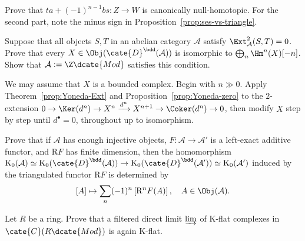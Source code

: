 \begin{Exercises}
	\begin{hint}
		Prove that $ta+(-1)^{n-1}bs:Z\to W$ is canonically null-homotopic. For
		the second part, note the minus sign in
		Proposition~\ref{prop:ses-vs-triangle}.
	\end{hint}

	\item Suppose that all objects $S,T$ in an abelian category $\mathcal{A}$
	satisfy $\Ext^2_{\mathcal{A}}(S,T)=0$. Prove that every
	$X\in\Obj(\cate{D}^{\bdd}(\mathcal{A}))$ is isomorphic to
	$\bigoplus_n\Hm^n(X)[-n]$. Show that $\mathcal{A}:=\Z\dcate{Mod}$
	satisfies this condition.

	\begin{hint}
		We may assume that $X$ is a bounded complex. Begin with $n\gg0$. Apply
		Theorem~\ref{prop:Yoneda-Ext} and Proposition~\ref{prop:Yoneda-zero} to
		the $2$-extension
		$0\to\Ker(d^n)\to X^n\xrightarrow{d^n}X^{n+1}\to\Coker(d^n)\to0$,
		then modify $X$ step by step until $d^\bullet=0$, throughout up to
		isomorphism.
	\end{hint}

	\item Prove that if $\mathcal{A}$ has enough injective objects,
	$F:\mathcal{A}\to\mathcal{A}'$ is a left-exact additive functor, and
	$\mathrm{R}F$ has finite dimension, then the homomorphism
	$\mathrm{K}_0(\mathcal{A})\simeq\mathrm{K}_0(\cate{D}^{\bdd}(\mathcal{A}))
	\to\mathrm{K}_0(\cate{D}^{\bdd}(\mathcal{A}'))\simeq
	\mathrm{K}_0(\mathcal{A}')$ induced by the triangulated functor
	$\mathrm{R}F$ is determined by
	\[ [A] \mapsto \sum_n (-1)^n \left[\mathrm{R}^n F(A)\right], \quad A \in \Obj(\mathcal{A}). \]

	\item Let $R$ be a ring. Prove that a filtered direct limit $\varinjlim$ of
	K-flat complexes in $\cate{C}(R\dcate{Mod})$ is again K-flat.


\end{Exercises}
